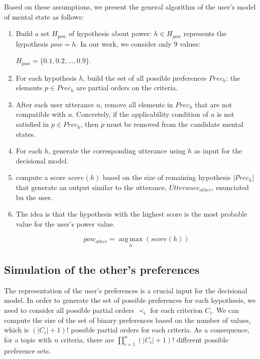 \documentclass[conference, letterpaper]{IEEEtran}
\begin{document}
	Based on these assumptions, we present the general algorithm of the user's model of mental state as follows:
	\begin{enumerate}
		\item Build a set $H_{pow}$ of hypothesis about power: $h\in H_{pow}$ represents the hypothesis $pow=h$. In our work, we consider only 9 values: 
		
		$H_{pow}=\{0.1, 0.2, \ldots, 0.9\}$.
		\item For each hypothesis $h$, build the set of all possible preferences $Prec_h$: the elements $p\in Prec_h$ are partial orders on the criteria.
		\item After each user utterance $u$, remove all elements in $Prec_h$ that are not compatible with $u$. Concretely, if the applicability condition of $u$ is not satisfied in $p\in Prec_h$, then $p$ must be removed from the candidate mental states.
		\item For each $h$, generate the corresponding utterance using $h$ as input for the decisional model.
		\item compute a score $score(h)$ based on the size of remaining hypothesis $|Prec_h|$ that generate an output similar to the utterance, $Utterance_{other}$, enunciated bu the user. 
		\item 	The idea is that the hypothesis with the highest score is the most probable value for the user's power value.

		\begin{equation}
		pow_{other} = \operatorname*{arg\,max}_{h} (score(h))
		\end{equation}
		
	\end{enumerate}
		
	
	\subsection{Simulation of the other's preferences}
	
		The representation of the user's preferences is a crucial input for the decisional model. In order to generate the set of possible preferences for each hypothesis, we need to consider all possible partial orders $\prec_i$ for each criterion $C_i$. 
		We can compute the size of the set of binary preferences based on the number of values, which is $(|C_i| + 1)!$ possible partial orders for each criteria. As a consequence, for a topic with $n$ criteria, there are $\prod_{i=1}^n (|C_i|+1)!$ different possible preference sets.
	
\end{document}
